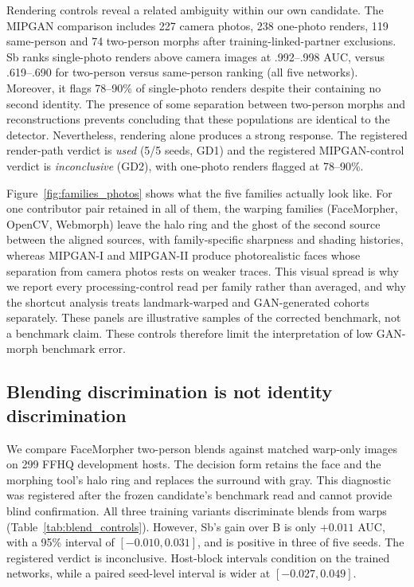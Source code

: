     Rendering controls reveal a related ambiguity within our own candidate. The MIPGAN comparison includes 227 camera photos, 238 one-photo renders, 119 same-person and 74 two-person morphs after training-linked-partner exclusions. Sb ranks single-photo renders above camera images at .992--.998 AUC, versus .619--.690 for two-person versus same-person ranking (all five networks). Moreover, it flags 78--90\% of single-photo renders despite their containing no second identity. The presence of some separation between two-person morphs and reconstructions prevents concluding that these populations are identical to the detector. Nevertheless, rendering alone produces a strong response. The registered render-path verdict is \emph{used} (5/5 seeds, GD1) and the registered MIPGAN-control verdict is \emph{inconclusive} (GD2), with one-photo renders flagged at 78--90\%.
    
    Figure~\ref{fig:families_photos} shows what the five families actually look like. For one contributor pair retained in all of them, the warping families (FaceMorpher, OpenCV, Webmorph) leave the halo ring and the ghost of the second source between the aligned sources, with family-specific sharpness and shading histories, whereas MIPGAN-I and MIPGAN-II produce photorealistic faces whose separation from camera photos rests on weaker traces. This visual spread is why we report every processing-control read per family rather than averaged, and why the shortcut analysis treats landmark-warped and GAN-generated cohorts separately. These panels are illustrative samples of the corrected benchmark, not a benchmark claim.
    These controls therefore limit the interpretation of low GAN-morph benchmark error.
    
    
    
    \subsection{Blending discrimination is not identity discrimination}
    \label{sec:blend_results}
    We compare FaceMorpher two-person blends against matched warp-only images on 299 FFHQ development hosts. The decision form retains the face and the morphing tool's halo ring and replaces the surround with gray. This diagnostic was registered after the frozen candidate's benchmark read and cannot provide blind confirmation. All three training variants discriminate blends from warps (Table~\ref{tab:blend_controls}). However, Sb's gain over B is only $+0.011$ AUC, with a 95\% interval of $[-0.010,0.031]$, and is positive in three of five seeds. The registered verdict is inconclusive. Host-block intervals condition on the trained networks, while a paired seed-level interval is wider at $[-0.027,0.049]$.
    
